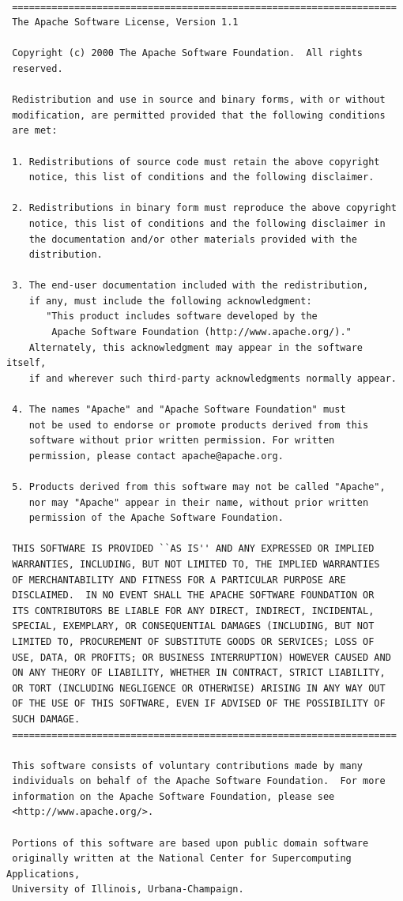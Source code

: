 \begin{lstlisting}[caption=licenza Apache 1.1]

 ====================================================================
 The Apache Software License, Version 1.1

 Copyright (c) 2000 The Apache Software Foundation.  All rights
 reserved.

 Redistribution and use in source and binary forms, with or without
 modification, are permitted provided that the following conditions
 are met:

 1. Redistributions of source code must retain the above copyright
    notice, this list of conditions and the following disclaimer.

 2. Redistributions in binary form must reproduce the above copyright
    notice, this list of conditions and the following disclaimer in
    the documentation and/or other materials provided with the
    distribution.

 3. The end-user documentation included with the redistribution,
    if any, must include the following acknowledgment:
       "This product includes software developed by the
        Apache Software Foundation (http://www.apache.org/)."
    Alternately, this acknowledgment may appear in the software itself,
    if and wherever such third-party acknowledgments normally appear.

 4. The names "Apache" and "Apache Software Foundation" must
    not be used to endorse or promote products derived from this
    software without prior written permission. For written
    permission, please contact apache@apache.org.

 5. Products derived from this software may not be called "Apache",
    nor may "Apache" appear in their name, without prior written
    permission of the Apache Software Foundation.

 THIS SOFTWARE IS PROVIDED ``AS IS'' AND ANY EXPRESSED OR IMPLIED
 WARRANTIES, INCLUDING, BUT NOT LIMITED TO, THE IMPLIED WARRANTIES
 OF MERCHANTABILITY AND FITNESS FOR A PARTICULAR PURPOSE ARE
 DISCLAIMED.  IN NO EVENT SHALL THE APACHE SOFTWARE FOUNDATION OR
 ITS CONTRIBUTORS BE LIABLE FOR ANY DIRECT, INDIRECT, INCIDENTAL,
 SPECIAL, EXEMPLARY, OR CONSEQUENTIAL DAMAGES (INCLUDING, BUT NOT
 LIMITED TO, PROCUREMENT OF SUBSTITUTE GOODS OR SERVICES; LOSS OF
 USE, DATA, OR PROFITS; OR BUSINESS INTERRUPTION) HOWEVER CAUSED AND
 ON ANY THEORY OF LIABILITY, WHETHER IN CONTRACT, STRICT LIABILITY,
 OR TORT (INCLUDING NEGLIGENCE OR OTHERWISE) ARISING IN ANY WAY OUT
 OF THE USE OF THIS SOFTWARE, EVEN IF ADVISED OF THE POSSIBILITY OF
 SUCH DAMAGE.
 ====================================================================

 This software consists of voluntary contributions made by many
 individuals on behalf of the Apache Software Foundation.  For more
 information on the Apache Software Foundation, please see
 <http://www.apache.org/>.

 Portions of this software are based upon public domain software
 originally written at the National Center for Supercomputing Applications,
 University of Illinois, Urbana-Champaign.

\end{lstlisting}

